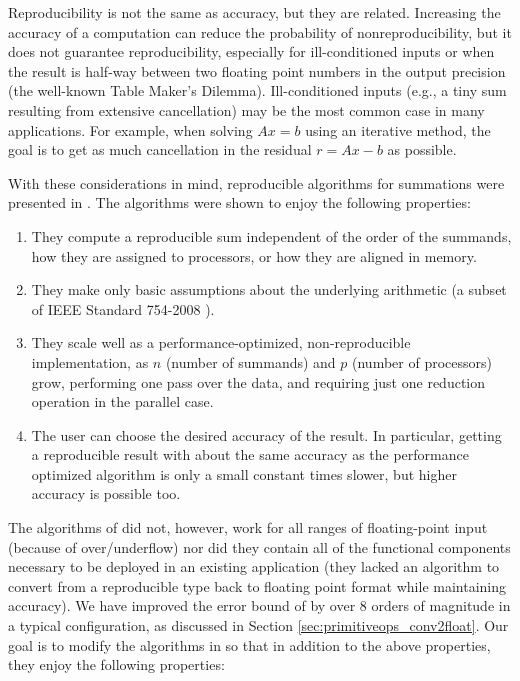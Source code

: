   Reproducibility is not the same as accuracy, but they are related. Increasing the accuracy of a computation can reduce the probability of nonreproducibility, but it does not guarantee reproducibility, especially for ill-conditioned inputs or when the result is half-way between two floating point numbers in the output precision (the well-known Table Maker's Dilemma)\cite{taufer}. Ill-conditioned inputs (e.g., a tiny sum resulting from extensive cancellation) may be the most common case in many applications. For example, when solving $Ax = b$ using an iterative method, the goal is to get as much cancellation in the residual $r = Ax - b$ as possible.

  With these considerations in mind, reproducible algorithms for summations were presented in \cite{repsum}. The algorithms were shown to enjoy the following properties:
  \begin{enumerate}
    \item They compute a reproducible sum independent of the order of the summands, how they are assigned to processors, or how they are aligned in memory.
    \item They make only basic assumptions about the underlying arithmetic (a subset of IEEE Standard 754-2008 \cite{ieee754}).
    \item They scale well as a performance-optimized, non-reproducible implementation, as $n$ (number of summands) and $p$ (number of processors) grow, performing one pass over the data, and requiring just one reduction operation in the parallel case.
    \item The user can choose the desired accuracy of the result. In particular, getting a reproducible result with about the same accuracy as the performance optimized algorithm is only a small constant times slower, but higher accuracy is possible too.
  \end{enumerate}
  The algorithms of \cite{repsum} did not, however, work for all ranges of floating-point input (because of over/underflow) nor did they contain all of the functional components necessary to be deployed in an existing application (they lacked an algorithm to convert from a reproducible type back to floating point format while maintaining accuracy).
   We have improved the error bound of \cite{repsum} by over 8 orders of magnitude in a typical configuration, as discussed in Section \ref{sec:primitiveops_conv2float}. Our goal is to modify the algorithms in \cite{repsum} so that in addition to the above properties, they enjoy the following properties:
